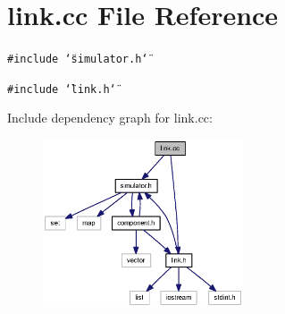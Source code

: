 \section{link.cc File Reference}
\label{link_8cc}
{\tt \#include \char`\"{}simulator.h\char`\"{}}\par
{\tt \#include \char`\"{}link.h\char`\"{}}\par


Include dependency graph for link.cc:\nopagebreak
\begin{figure}[H]
\begin{center}
\leavevmode
\includegraphics[width=168pt]{link_8cc__incl}
\end{center}
\end{figure}
